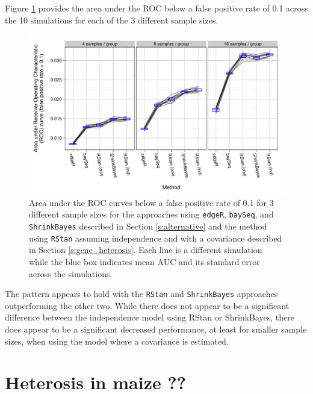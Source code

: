 \documentclass[useAMS,usenatbib,referee]{biom}
\begin{document}
Figure \ref{f:auc} provides the area under the ROC below a false positive rate of 0.1 across the 10 simulations for each of the 3 different sample sizes. 
\begin{figure}
\centerline{\includegraphics[width=\textwidth]{auc-facet-TRUE}}
\caption{Area under the ROC curves below a false positive rate of 0.1 for 3 different sample sizes for the approaches using {\tt edgeR}, {\tt baySeq},  and {\tt ShrinkBayes} described in Section \ref{s:alternative} and the method using {\tt RStan} assuming independence and with a covariance described in Section \ref{s:gene_heterosis}. Each line is a different simulation while the blue box indicates mean AUC and its standard error across the simulations.}
\label{f:auc}
\end{figure}
The pattern appears to hold with the {\tt RStan} and {\tt ShrinkBayes} approaches outperforming the other two. While there does not appear to be a significant difference between the independence model using RStan or ShrinkBayes, there does appear to be a significant decreased performance, at least for smaller sample sizes, when using the model where a covariance is estimated. 


\section{Heterosis in maize ??}
\label{s:corn}
\end{document}
